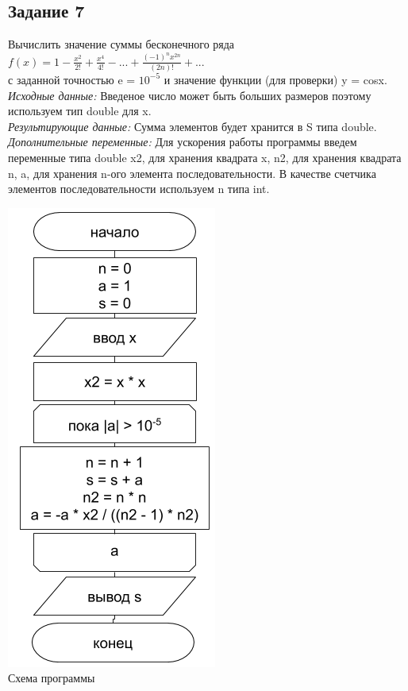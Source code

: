\documentclass[a4paper,14pt]{extarticle}
\begin{document}
\subsection{Задание 7}
Вычислить значение суммы бесконечного ряда\\
$f(x) = 1 - \displaystyle\frac{x^2}{2!} + \frac{x^4}{4!} - ... + \frac{(-1)^nx^{2n}}{(2n)!} + ...$\\
с заданной точностью e = $10^{-5}$ и значение функции (для проверки) y = cosx. 
\textit{Исходные данные:} Введеное число может быть больших размеров поэтому используем тип double для x.\\
\textit{Результирующие данные:} Сумма элементов будет хранится в S типа double.\\
\textit{Дополнительные переменные:} Для ускорения работы программы введем переменные типа double x2, для хранения квадрата x, n2, для хранения квадрата n, a, для хранения n-ого элемента последовательности. В качестве счетчика элементов последовательности используем n типа int.\\
\begin{center}
\includegraphics[scale=0.6]{lab2-7.png}\\
Схема программы
\end{center}
\end{document}
